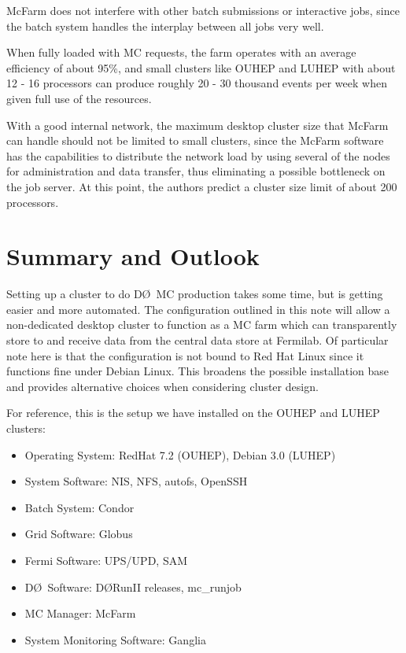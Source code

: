 \documentclass{revtex4}
\newcommand{\DO}{\mbox{D\O}}
\begin{document}
McFarm does not interfere with other batch submissions 
or interactive jobs, since the batch system handles
the interplay between all jobs very well.

When fully loaded with MC requests, the farm operates with an average 
efficiency of about 95\%, and small clusters like OUHEP and LUHEP
with about 12 - 16 processors can produce roughly 20 - 30 thousand events
per week when given full use of the resources.

With a good internal network, the maximum desktop cluster size 
that McFarm can handle should not be limited to small clusters, 
since the McFarm software has the capabilities to distribute the network 
load by using several of the nodes for administration and data transfer, 
thus eliminating a possible bottleneck on the job server.
At this point, the authors predict a cluster size limit of about 
200 processors.

\section{Summary and Outlook}

Setting up a cluster to do \DO\ MC production takes some time,
but is getting easier and more automated.  The configuration outlined
in this note will allow a non-dedicated desktop cluster to function as
a MC farm which can transparently store to and receive data from the
central data store at Fermilab.  Of particular note here is that the
configuration is not bound to Red Hat Linux since it functions fine
under Debian Linux.  This broadens the possible installation base and
provides alternative choices when considering cluster design.

For reference, this is the setup we have installed on the OUHEP and
LUHEP clusters:
\begin{itemize}
\item Operating System: RedHat 7.2 (OUHEP), Debian 3.0 (LUHEP)
\item System Software: NIS, NFS, autofs, OpenSSH
\item Batch System: Condor
\item Grid Software: Globus
\item Fermi Software: UPS/UPD, SAM
\item \DO\ Software: \DO RunII releases, mc\_runjob
\item MC Manager: McFarm
\item System Monitoring Software: Ganglia
\end{itemize}
\end{document}
